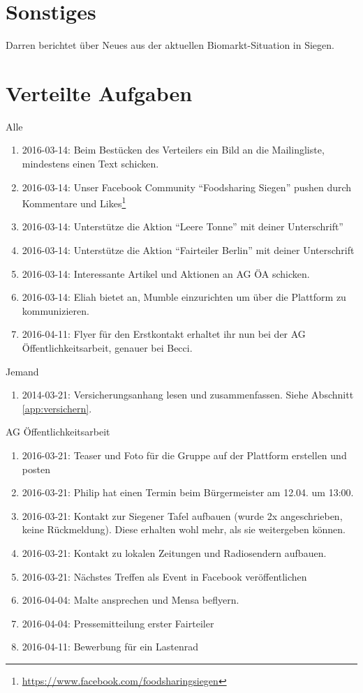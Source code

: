 \documentclass{scrreprt}
\begin{document}
{\chapter{Sonstiges}
Darren berichtet über Neues aus der aktuellen Biomarkt-Situation in Siegen.

\chapter{Verteilte Aufgaben}

Alle
\begin{enumerate}
\item 2016-03-14: Beim Bestücken des Verteilers ein Bild an die Mailingliste, mindestens einen Text schicken.
\item 2016-03-14: Unser Facebook Community \enquote{Foodsharing Siegen} pushen durch Kommentare und Likes\footnote{\url{https://www.facebook.com/foodsharingsiegen}}
\item 2016-03-14: Unterstütze die Aktion \enquote{Leere Tonne” mit deiner Unterschrift}
\item 2016-03-14: Unterstütze die Aktion \enquote{Fairteiler Berlin} mit deiner Unterschrift
\item 2016-03-14: Interessante Artikel und Aktionen an AG ÖA schicken.
\item 2016-03-14: Eliah bietet an, Mumble einzurichten um über die Plattform zu kommunizieren.
\item 2016-04-11: Flyer für den Erstkontakt erhaltet ihr nun bei der AG Öffentlichkeitsarbeit, genauer bei Becci.
\end{enumerate}


Jemand
\begin{enumerate}
\item 2014-03-21: Versicherungsanhang lesen und zusammenfassen. Siehe Abschnitt \ref{app:versichern}.
\end{enumerate}

AG Öffentlichkeitsarbeit
\begin{enumerate}
    \item 2016-03-21: Teaser und Foto für die Gruppe auf der Plattform erstellen und posten
    \item 2016-03-21: Philip hat einen Termin beim Bürgermeister am 12.04. um 13:00.
    \item 2016-03-21: Kontakt zur Siegener Tafel aufbauen (wurde 2x angeschrieben, keine Rückmeldung). Diese erhalten wohl mehr, als sie weitergeben können.
    \item 2016-03-21: Kontakt zu lokalen Zeitungen und Radiosendern aufbauen.
    \item 2016-03-21: Nächstes Treffen als Event in Facebook veröffentlichen
    \item 2016-04-04: Malte ansprechen und Mensa beflyern.
    \item 2016-04-04: Pressemitteilung erster Fairteiler
    \item 2016-04-11: Bewerbung für ein Lastenrad
\end{enumerate}

}
\end{document}

